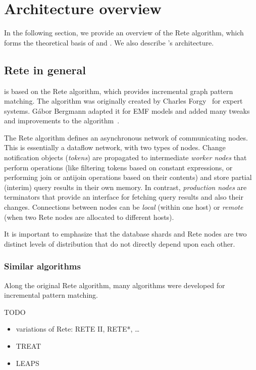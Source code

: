 \section{Architecture overview}
\label{sec:architecture}

In the following section, we provide an overview of the Rete algorithm, which forms the theoretical basis of \eiq{} and \iqd{}. We also describe \iqd{}'s architecture.

\subsection{Rete in general}
\label{subsec:rete}

\iqd{} is based on the Rete algorithm, which provides incremental graph pattern matching. The algorithm was originally created by Charles Forgy~\cite{Forgy} for expert systems. Gábor Bergmann adapted it for EMF models and added many tweaks and improvements to the algorithm~\cite{BergmannRete}.

The Rete algorithm defines an asynchronous network of communicating nodes. This is essentially a dataflow network, with two types of nodes. Change notification objects (\emph{tokens}) are propagated to intermediate \emph{worker nodes} that perform operations (like filtering tokens based on constant expressions, or performing join or antijoin operations based on their contents) and store partial (interim) query results in their own memory. In contrast, \emph{production nodes} are terminators that provide an interface for fetching query results and also their changes. Connections between nodes can be \emph{local} (within one host) or \emph{remote} (when two Rete nodes are allocated to different hosts).

It is important to emphasize that the database shards and Rete nodes are two distinct levels of distribution that do not directly depend upon each other.

\subsubsection{Similar algorithms}

Along the original Rete algorithm, many algorithms were developed for incremental pattern matching.

TODO

\begin{itemize}
  \item variations of Rete: RETE II, RETE*, \ldots
  \item TREAT \cite{Miranker:1991:OPT:627280.627434}
  \item LEAPS \cite{Batory:1994:LA:899216}
\end{itemize} 

